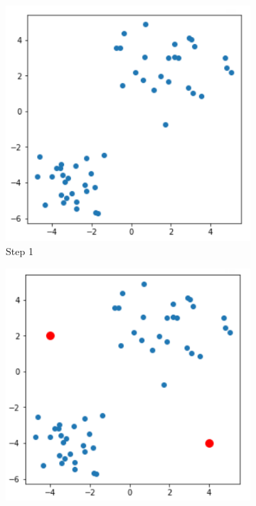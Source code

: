 \documentclass[11pt]{article}
\begin{document}
\pagebreak

\begin{figure}[h]
    \centering
    \begin{subfigure}[b]{0.24\textwidth}
        \centering
        \includegraphics[width=\linewidth]{../imgs/knn-proc-1.png}
        \caption{Step 1}
    \end{subfigure}
    \begin{subfigure}[b]{0.24\textwidth}
        \centering
        \includegraphics[width=\linewidth]{../imgs/knn-proc-2.png}

\end{subfigure}
\end{figure}
\end{document}
